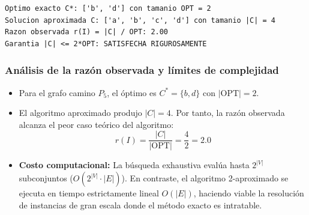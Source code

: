\begin{lstlisting}[style=consolestyle, caption={Salida de consola del Ejercicio Resuelto 3}]
Optimo exacto C*: ['b', 'd'] con tamanio OPT = 2
Solucion aproximada C: ['a', 'b', 'c', 'd'] con tamanio |C| = 4
Razon observada r(I) = |C| / OPT: 2.00
Garantia |C| <= 2*OPT: SATISFECHA RIGUROSAMENTE
\end{lstlisting}

\subsubsection*{Análisis de la razón observada y límites de complejidad}
\begin{itemize}
    \item Para el grafo camino $P_5$, el óptimo es $C^* = \{b, d\}$ con $|\text{OPT}| = 2$.
    \item El algoritmo aproximado produjo $|C| = 4$. Por tanto, la razón observada alcanza el peor caso teórico del algoritmo:
    \begin{equation}
        r(I) = \frac{|C|}{|\text{OPT}|} = \frac{4}{2} = 2.0
    \end{equation}
    \item \textbf{Costo computacional:} La búsqueda exhaustiva evalúa hasta $2^{|V|}$ subconjuntos ($O(2^{|V|} \cdot |E|)$). En contraste, el algoritmo 2-aproximado se ejecuta en tiempo estrictamente lineal $O(|E|)$, haciendo viable la resolución de instancias de gran escala donde el método exacto es intratable.
\end{itemize}
